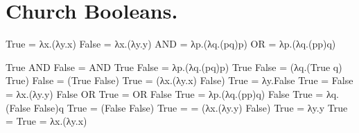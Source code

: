 \section{ Church Booleans. }

True = λx.(λy.x)
False = λx.(λy.y)
AND = λp.(λq.(pq)p)
OR = λp.(λq.(pp)q)

True AND False = AND True False = λp.(λq.(pq)p) True False 
               = (λq.(True q) True) False = (True False) True 
               = (λx.(λy.x) False) True = λy.False True = False = λx.(λy.y)
False OR True  = OR False True = λp.(λq.(pp)q) False True
               = λq.(False False)q True = (False False) True =
               = (λx.(λy.y) False) True = λy.y True = True = λx.(λy.x)
